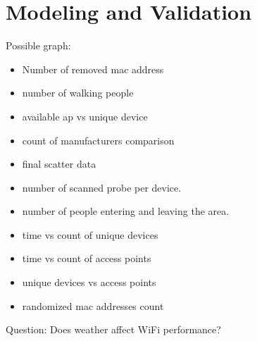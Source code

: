 \chapter{Modeling and Validation}
\label{ch:modeling-validation} %
Possible graph:
\begin{itemize}
	\item Number of removed mac address
	\item number of walking people
	\item available ap vs unique device
	\item count of manufacturers comparison
	\item final scatter data
	\item number of scanned probe per device.
	\item number of people entering and leaving the area.
	\item time vs count of unique devices
	\item time vs count of access points
	\item unique devices vs access points
	\item randomized mac addresses count
\end{itemize}

Question: Does weather affect WiFi performance?

